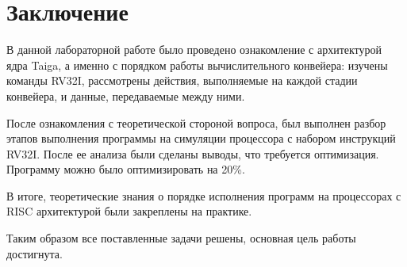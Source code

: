 \section*{Заключение}
В данной лабораторной работе было проведено ознакомление с архитектурой ядра Taiga, а именно с порядком работы вычислительного конвейера: изучены команды RV32I, рассмотрены действия, выполняемые
на каждой стадии конвейера, и данные, передаваемые между ними.

После ознакомления с теоретической стороной вопроса, был выполнен разбор этапов выполнения программы на симуляции процессора с набором инструкций RV32I. После ее анализа были сделаны выводы, что требуется оптимизация. Программу можно было оптимизировать на 20\%.

В итоге, теоретические знания о порядке исполнения программ на процессорах с RISC архитектурой были закреплены на практике. 

Таким образом все поставленные задачи решены, основная цель работы достигнута.
\newpage